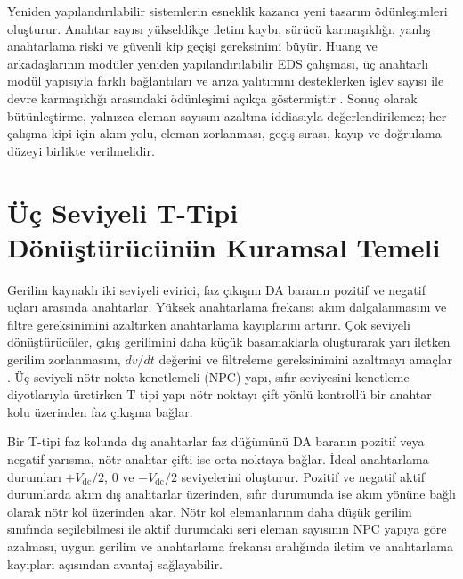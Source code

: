 Yeniden yapılandırılabilir sistemlerin esneklik kazancı yeni tasarım ödünleşimleri oluşturur. Anahtar sayısı yükseldikçe iletim kaybı, sürücü karmaşıklığı, yanlış anahtarlama riski ve güvenli kip geçişi gereksinimi büyür. Huang ve arkadaşlarının modüler yeniden yapılandırılabilir EDS çalışması, üç anahtarlı modül yapısıyla farklı bağlantıları ve arıza yalıtımını desteklerken işlev sayısı ile devre karmaşıklığı arasındaki ödünleşimi açıkça göstermiştir \citep{Huang2024}. Sonuç olarak bütünleştirme, yalnızca eleman sayısını azaltma iddiasıyla değerlendirilemez; her çalışma kipi için akım yolu, eleman zorlanması, geçiş sırası, kayıp ve doğrulama düzeyi birlikte verilmelidir.


\section{Üç Seviyeli T-Tipi Dönüştürücünün Kuramsal Temeli}

Gerilim kaynaklı iki seviyeli evirici, faz çıkışını DA baranın pozitif ve negatif uçları arasında anahtarlar. Yüksek anahtarlama frekansı akım dalgalanmasını ve filtre gereksinimini azaltırken anahtarlama kayıplarını artırır. Çok seviyeli dönüştürücüler, çıkış gerilimini daha küçük basamaklarla oluşturarak yarı iletken gerilim zorlanmasını, $dv/dt$ değerini ve filtreleme gereksinimini azaltmayı amaçlar \citep{Mohan2003,Holmes2003}. Üç seviyeli nötr nokta kenetlemeli (NPC) yapı, sıfır seviyesini kenetleme diyotlarıyla üretirken T-tipi yapı nötr noktayı çift yönlü kontrollü bir anahtar kolu üzerinden faz çıkışına bağlar.

Bir T-tipi faz kolunda dış anahtarlar faz düğümünü DA baranın pozitif veya negatif yarısına, nötr anahtar çifti ise orta noktaya bağlar. İdeal anahtarlama durumları $+V_{\mathrm{dc}}/2$, $0$ ve $-V_{\mathrm{dc}}/2$ seviyelerini oluşturur. Pozitif ve negatif aktif durumlarda akım dış anahtarlar üzerinden, sıfır durumunda ise akım yönüne bağlı olarak nötr kol üzerinden akar. Nötr kol elemanlarının daha düşük gerilim sınıfında seçilebilmesi ile aktif durumdaki seri eleman sayısının NPC yapıya göre azalması, uygun gerilim ve anahtarlama frekansı aralığında iletim ve anahtarlama kayıpları açısından avantaj sağlayabilir.

